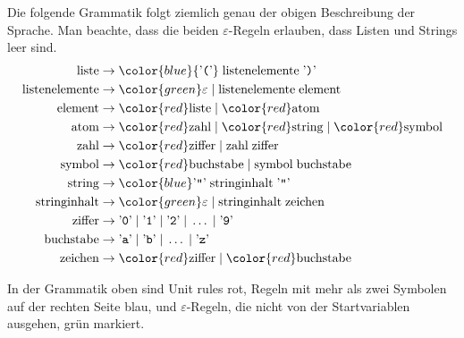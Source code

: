 \begin{loesung}
\begin{teilaufgaben}
\item Die folgende Grammatik folgt ziemlich genau der obigen Beschreibung
der Sprache. Man beachte, dass die beiden $\varepsilon$-Regeln
erlauben, dass Listen und Strings leer sind.
\begin{align*}
\text{liste}&\rightarrow {\color{blue}
{\text{'{\tt (}'}}\;
\text{listenelemente}\;
{\text{'{\tt )}'}}}
\\
\text{listenelemente}&\rightarrow {\color{green}\varepsilon} \;|\; \text{listenelemente}\;\text{element}
\\
\text{element}&\rightarrow {\color{red}\text{liste}} \;|\; {\color{red}\text{atom}}
\\
\text{atom}&\rightarrow {\color{red}\text{zahl}}\;|\;{\color{red}\text{string}}\;|\;{\color{red}\text{symbol}}
\\
\text{zahl}&\rightarrow {\color{red}\text{ziffer}}\;|\;\text{zahl}\;\text{ziffer}
\\
\text{symbol}&\rightarrow {\color{red}\text{buchstabe}} \;|\; \text{symbol}\;\text{buchstabe}
\\
\text{string}&\rightarrow {\color{blue}
\text{'{\tt\textquotedblright}'}\; \text{stringinhalt}\;
\text{'{\tt\textquotedblright}'}}
\\
\text{stringinhalt}&\rightarrow {\color{green}\varepsilon} \;|\; \text{stringinhalt}\;\text{zeichen}
\\
\text{ziffer}&\rightarrow
{\text{'{\tt 0}'}} \;|\;
{\text{'{\tt 1}'}} \;|\;
{\text{'{\tt 2}'}} \;|\;
\dots \;|\;
{\text{'{\tt 9}'}}
\\
\text{buchstabe}&\rightarrow
{\text{'{\tt a}'}} \;|\;
{\text{'{\tt b}'}} \;|\;
\dots \;|\;
{\text{'{\tt z}'}}
\\
\text{zeichen}&\rightarrow {\color{red}\text{ziffer}}\; |\; {\color{red}\text{buchstabe}}
\end{align*}
\item
In der Grammatik oben sind
Unit rules
{\color{red}
rot},
Regeln mit mehr als zwei Symbolen auf der rechten Seite
{\color{blue}
blau},
und
$\varepsilon$-Regeln, die nicht von der Startvariablen ausgehen,
{\color{green}
grün} markiert.
\qedhere
\end{teilaufgaben}
\end{loesung}

